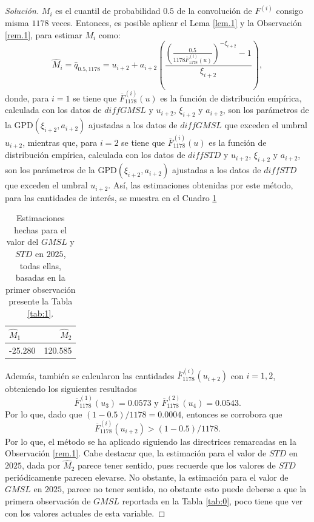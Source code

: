 \documentclass[10.5pt,notitlepage]{article}
\newenvironment{solucion}
  {\begin{proof}[Solución]}
  {\end{proof}}
\newcommand{\pare}[1]{\left( #1 \right)}
\theoremstyle{plain}
\begin{document}
\begin{solucion}
\(
M_{i}
\)
es el cuantil de probabilidad \(0.5\) de la convolución de \(F^{(i)}\) consigo misma \(1178\) veces. Entonces, es posible aplicar el Lema \ref{lem.1} y la Observación \ref{rem.1}, para estimar \(M_i\) como: 
\[
\hat{M}_{i} = \hat{q}_{0.5,1178} =  u_{i +2} + a_{i + 2}\pare{\frac{\pare{\frac{0.5}{1178\overline{F}^{(i)}_{1178}(u)}}^{-\xi_{i+2}} - 1}{\xi_{i+2}}}, 
\]
donde, para \(i = 1\) se tiene que \(\overline{F}^{(i)}_{1178}(u)\) es la función de distribución empírica, calculada con los datos de \(diffGMSL\) y \(u_{i+2}\), \(\xi_{i+2}\) y \(a_{i+2}\), son los parámetros de la GPD\((\xi_{i+2},a_{i+2})\) ajustadas a los datos de \(diffGMSL\) que exceden el umbral \(u_{i+2}\), mientras que, para \(i = 2\) se tiene que \(\overline{F}^{(i)}_{1178}(u)\) es la función de distribución empírica, calculada con los datos de \(diffSTD\) y \(u_{i+2}\), \(\xi_{i+2}\) y \(a_{i+2}\), son los parámetros de la GPD\((\xi_{i+2},a_{i+2})\) ajustadas a los datos de \(diffSTD\) que exceden el umbral \(u_{i+2}\). Así, las estimaciones obtenidas por este método, para las cantidades de interés, se muestra en el Cuadro \ref{tab:000}
\begin{table}[H]
        \centering
        \begin{tabular}{@{}l@{\hskip 0.3in}r@{}}
        \toprule
        \(\hat{M}_1\)&  \(\hat{M}_2\)\\
        \midrule         
        -25.280&  120.585\\
        \end{tabular}
        \caption{Estimaciones hechas para el valor del \(GMSL\) y \(STD\) en \(2025\), todas ellas, basadas en la primer observación presente la Tabla \ref{tab:1}.}
        \label{tab:000}
\end{table} 

Además, también se calcularon las cantidades \(\overline{F}_{1178}^{(i)}(u_{i+2})\) con \(i = 1,2\), obteniendo los siguientes resultados
\[
\overline{F}_{1178}^{(1)}(u_{3}) = 0.0573 \text{ y } \overline{F}_{1178}^{(2)}(u_{4}) =  0.0543. 
\]
Por lo que, dado que \((1-0.5)/1178 = 0.0004\), entonces se corrobora que 
\[
\overline{F}_{1178}^{(i)}(u_{i+2}) > (1-0.5)/1178.
\]
Por lo que, el método se ha aplicado siguiendo las directrices remarcadas en la Observación \ref{rem.1}. Cabe destacar que, la estimación para el valor de \(STD\) en \(2025\), dada por \(\hat{M}_2\) parece tener sentido, pues recuerde que los valores de \(STD\) periódicamente parecen elevarse. No obstante, la estimación para el valor de \(GMSL\) en \(2025\), parece no tener sentido, no obstante esto puede deberse a que la primera observación de \(GMSL\) reportada en la Tabla \ref{tab:0}, poco tiene que ver con los valores actuales de esta variable.





\end{solucion}
\newpage 
\end{document}
